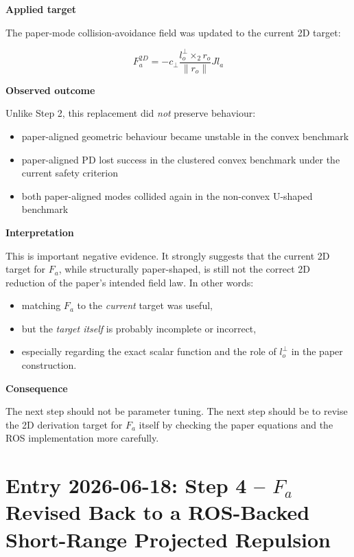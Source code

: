 \documentclass[11pt]{article}
\begin{document}
\textbf{Applied target}

The paper-mode collision-avoidance field was updated to the current 2D target:

\begin{equation}
F_a^{2D}
=
-c_\perp
\frac{l_o^\perp \times_2 r_o}{\lVert r_o \rVert}
J l_a
\end{equation}

\textbf{Observed outcome}

Unlike Step 2, this replacement did \emph{not} preserve behaviour:

\begin{itemize}[leftmargin=*]
  \item paper-aligned geometric behaviour became unstable in the convex benchmark
  \item paper-aligned PD lost success in the clustered convex benchmark under the current safety criterion
  \item both paper-aligned modes collided again in the non-convex U-shaped benchmark
\end{itemize}

\textbf{Interpretation}

This is important negative evidence. It strongly suggests that the current 2D
target for \(F_a\), while structurally paper-shaped, is still not the correct
2D reduction of the paper's intended field law. In other words:

\begin{itemize}[leftmargin=*]
  \item matching \(F_a\) to the \emph{current} target was useful,
  \item but the \emph{target itself} is probably incomplete or incorrect,
  \item especially regarding the exact scalar function and the role of
  \(l_o^\perp\) in the paper construction.
\end{itemize}

\textbf{Consequence}

The next step should not be parameter tuning. The next step should be to revise
the 2D derivation target for \(F_a\) itself by checking the paper equations and
the ROS implementation more carefully.

\section*{Entry 2026-06-18: Step 4 -- \(F_a\) Revised Back to a ROS-Backed Short-Range Projected Repulsion}
\end{document}
